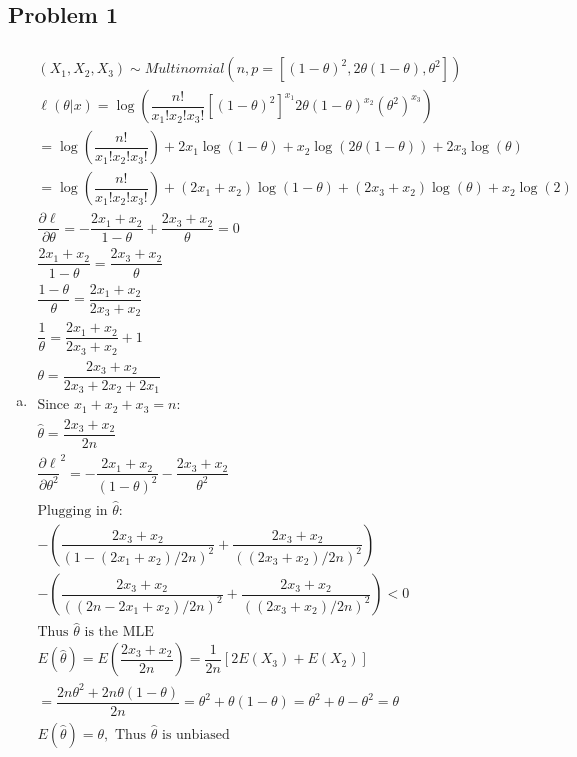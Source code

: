 \documentclass{article}
\newcommand{\hth}{\hat{\theta}}
\newcommand{\dll}[1]{\dfrac{\partial\ell}{\partial{#1}}}
\newcommand{\ta}{\theta}
\begin{document}
\begin{flushleft}

	\section*{Problem 1}
	
\begin{enumerate}[(a)]
	
	\item 
\begin{multline*}\\
(X_1,X_2,X_3)\sim Multinomial(n,p=[(1-\theta)^2,2\theta(1-\theta),\ta^2])\\
\ell(\ta|x)=\log\left(\dfrac{n!}{x_1!x_2!x_3!}[(1-\theta)^2]^{x_1}2\theta(1-\theta)^{x_2}(\ta^2)^{x_3}\right)\\
=\log\left(\dfrac{n!}{x_1!x_2!x_3!}\right)+2x_1\log(1-\theta)+x_2\log(2\theta(1-\theta))+2x_3\log(\ta)\\
=\log\left(\dfrac{n!}{x_1!x_2!x_3!}\right)+ (2x_1+x_2)\log(1-\theta)+(2x_3+x_2)\log(\theta)+x_2\log(2)\\
\dll{\theta}=-\dfrac{2x_1+x_2}{1-\ta}+\dfrac{2x_3+x_2}{\ta}=0\\
\dfrac{2x_1+x_2}{1-\ta}=\dfrac{2x_3+x_2}{\ta}\\
\dfrac{1-\ta}{\ta}=\dfrac{2x_1+x_2}{2x_3+x_2}\\
\dfrac{1}{\theta}=\dfrac{2x_1+x_2}{2x_3+x_2}+1\\
\ta=\dfrac{2x_3+x_2}{2x_3+2x_2+2x_1}\\
\text{Since } x_1+x_2+x_3=n:\\
\hth=\dfrac{2x_3+x_2}{2n}\\
\dll{\ta^2}^2=-\dfrac{2x_1+x_2}{(1-\ta)^2}-\dfrac{2x_3+x_2}{\ta^2}\\
\text{Plugging in } \hth:\\
-\left(\dfrac{2x_3+x_2}{(1-(2x_1+x_2)/2n)^2}+\dfrac{2x_3+x_2}{((2x_3+x_2)/2n)^2}\right)\\
-\left(\dfrac{2x_3+x_2}{((2n-2x_1+x_2)/2n)^2}+\dfrac{2x_3+x_2}{((2x_3+x_2)/2n)^2}\right)<0\\
\text{Thus } \hth \text{ is the MLE}\\
E(\hth)=E\left(\dfrac{2x_3+x_2}{2n} \right)=\dfrac{1}{2n}[2E(X_3)+E(X_2)]\\
=\dfrac{2n\ta^2+2n\ta(1-\ta)}{2n}=\ta^2+\ta(1-\ta)=\ta^2+\ta-\ta^2=\ta\\
E(\hth)=\theta, \text{ Thus } \hth \text{ is unbiased}\\
\end{multline*}


\end{enumerate}
\end{flushleft}
\end{document}
